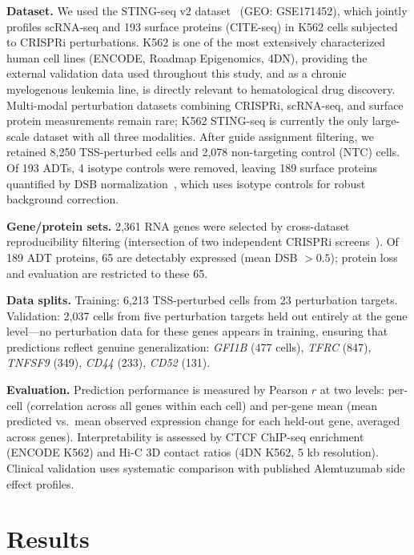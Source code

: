 \documentclass{article}
\begin{document}
\textbf{Dataset.} We used the STING-seq v2 dataset~\citep{morris2023} (GEO: GSE171452), which jointly profiles scRNA-seq and 193 surface proteins (CITE-seq) in K562 cells subjected to CRISPRi perturbations. K562 is one of the most extensively characterized human cell lines (ENCODE, Roadmap Epigenomics, 4DN), providing the external validation data used throughout this study, and as a chronic myelogenous leukemia line, is directly relevant to hematological drug discovery. Multi-modal perturbation datasets combining CRISPRi, scRNA-seq, and surface protein measurements remain rare; K562 STING-seq is currently the only large-scale dataset with all three modalities. After guide assignment filtering, we retained 8,250 TSS-perturbed cells and 2,078 non-targeting control (NTC) cells. Of 193 ADTs, 4 isotype controls were removed, leaving 189 surface proteins quantified by DSB normalization~\citep{muleisenburger2020}, which uses isotype controls for robust background correction.

\textbf{Gene/protein sets.} 2,361 RNA genes were selected by cross-dataset reproducibility filtering (intersection of two independent CRISPRi screens~\citep{morris2023,gasperini2019}). Of 189 ADT proteins, 65 are detectably expressed (mean DSB $> 0.5$); protein loss and evaluation are restricted to these 65.

\textbf{Data splits.} Training: 6,213 TSS-perturbed cells from 23 perturbation targets. Validation: 2,037 cells from five perturbation targets held out entirely at the gene level---no perturbation data for these genes appears in training, ensuring that predictions reflect genuine generalization: \textit{GFI1B} (477 cells), \textit{TFRC} (847), \textit{TNFSF9} (349), \textit{CD44} (233), \textit{CD52} (131).

\textbf{Evaluation.} Prediction performance is measured by Pearson $r$ at two levels: per-cell (correlation across all genes within each cell) and per-gene mean (mean predicted vs.\ mean observed expression change for each held-out gene, averaged across genes). Interpretability is assessed by CTCF ChIP-seq enrichment (ENCODE K562) and Hi-C 3D contact ratios (4DN K562, 5 kb resolution). Clinical validation uses systematic comparison with published Alemtuzumab side effect profiles.

\section{Results}
\end{document}
